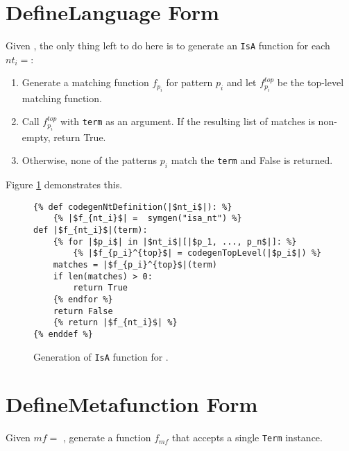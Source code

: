 \section{DefineLanguage Form}
Given \DefineLanguage, the only thing left to do here is to generate an \texttt{IsA} function for each $nt_i=$\space\NtDefinition:
\begin{enumerate}
\item Generate a matching function $f_{p_i}$ for pattern $p_i$ and let $f_{p_i}^{top}$ be the top-level matching function.
\item Call $f_{p_i}^{top}$ with \texttt{term} as an argument. If the resulting list of matches is non-empty, return True.
\item Otherwise, none of the patterns $p_i$ match the \texttt{term} and False is returned.
\end{enumerate}

Figure \ref{codegen-ntdef} demonstrates this.

\begin{figure}
\begin{verbatim}
{% def codegenNtDefinition(|$nt_i$|): %}
	{% |$f_{nt_i}$| =  symgen("isa_nt") %}
def |$f_{nt_i}$|(term):
	{% for |$p_i$| in |$nt_i$|[|$p_1, ..., p_n$|]: %}
		{% |$f_{p_i}^{top}$| = codegenTopLevel(|$p_i$|) %}
	matches = |$f_{p_i}^{top}$|(term)
	if len(matches) > 0:
		return True
	{% endfor %}
	return False
	{% return |$f_{nt_i}$| %}
{% enddef %}
\end{verbatim}
\caption{Generation of \texttt{IsA} function for \NtDefinitionNoArgs.}
\label{codegen-ntdef}
\end{figure}

\section{DefineMetafunction Form}

Given $mf=$ \DefineMetafunction, generate a function $f_{mf}$ that accepts a single \texttt{Term} instance.

